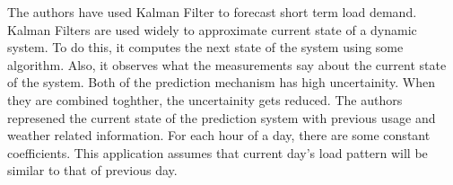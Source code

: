 The authors \cite{al2004short} have used Kalman Filter to forecast short term load demand. Kalman Filters are used widely to approximate current state of a dynamic system. To do this, it computes the next state of the system using some algorithm. Also, it observes what the measurements say about the current state of the system. Both of the prediction mechanism has high uncertainity. When they are combined toghther, the uncertainity gets reduced. The authors represened the current state of the prediction system with previous usage and weather related information. For each hour of a day, there are some constant coefficients. This application assumes that current day's load pattern will be similar to that of previous day.


